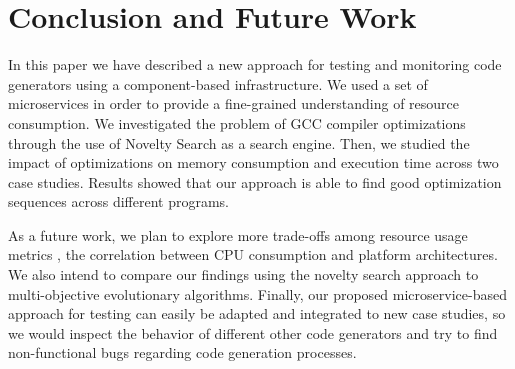 \section{Conclusion and Future Work}

In this paper we have described a new approach for testing and monitoring code generators using a component-based infrastructure. 
We used a set of microservices in order to provide a fine-grained understanding of resource consumption. 
We investigated the problem of GCC compiler optimizations through the use of Novelty Search as a search engine. 
Then, we studied the impact of optimizations on memory consumption and execution time across two case studies. 
Results showed that our approach is able to find good optimization sequences across different programs.

As a future work, we plan to explore more trade-offs among resource usage metrics \eg, the correlation between CPU consumption and platform architectures. 
We also intend to compare our findings using the novelty search approach to multi-objective evolutionary algorithms. 
Finally, our proposed microservice-based approach for testing can easily be adapted and integrated to new case studies, so we would inspect the behavior of different other code generators and try to find non-functional bugs regarding code generation processes.

